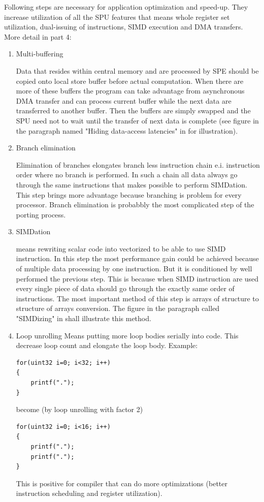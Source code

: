 \par
Following steps are necessary for application optimization and speed-up.
They increase utilization of all the SPU features that means whole register set utilization, dual-issuing of instructions, SIMD execution and DMA transfers.
More detail in \cite{writingPerfApps} part 4:
\\
\begin{enumerate}
\item{Multi-buffering}
\par
Data that resides within central memory and are processed by SPE should be copied onto local store buffer before actual computation.
When there are more of these buffers the program can take advantage from asynchronous DMA transfer and can process current buffer while the next data are transferred to another buffer.
Then the buffers are simply swapped and the SPU need not to wait until the transfer of next data is complete (see figure in the paragraph named "Hiding data-access latencies" in \cite{compilerOptions} for illustration).

\item{Branch elimination}
\par
Elimination of branches elongates branch less instruction chain e.i. instruction order where no branch is performed.
In such a chain all data always go through the same instructions that makes possible to perform SIMDation.
This step brings more advantage because branching is problem for every processor.
Branch elimination is probabbly the most complicated step of the porting process.

\item{SIMDation}
\par
means rewriting scalar code into vectorized to be able to use SIMD instruction.
In this step the most performance gain could be achieved because of multiple data processing by one instruction.
But it is conditioned by well performed the previous step.
This is because when SIMD instruction are used every single piece of data should go through the exactly same order of instructions.
The most important method of this step is arrays of structure to structure of arrays conversion.
The figure in the paragraph called "SIMDizing" in \cite{compilerOptions} shall illustrate this method.

\item{Loop unrolling}
Means putting more loop bodies serially into code.
This decrease loop count and elongate the loop body.
Example:
\begin{verbatim}
for(uint32 i=0; i<32; i++)
{
    printf(".");
}
\end{verbatim}
become (by loop unrolling with factor 2)
\begin{verbatim}
for(uint32 i=0; i<16; i++)
{
    printf(".");
    printf(".");
}
\end{verbatim}
This is positive for compiler that can do more optimizations (better instruction scheduling and register utilization).


\end{enumerate}
